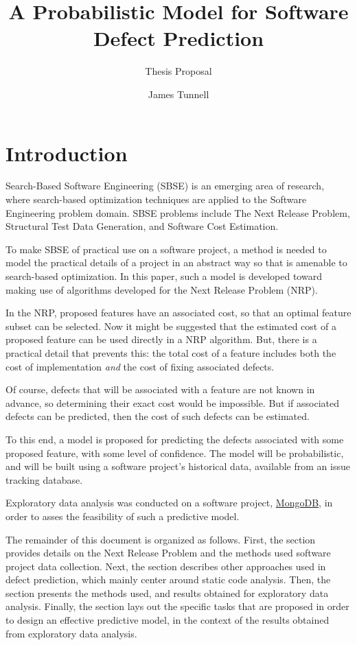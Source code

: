 \documentclass[a4paper]{scrartcl}
\begin{document}
\title{A Probabilistic Model for Software Defect Prediction}
\subtitle{Thesis Proposal}
\author{James Tunnell}
\maketitle

\section{Introduction}
Search-Based Software Engineering (SBSE) is an emerging area of research, where search-based optimization techniques are applied to the Software Engineering problem domain. SBSE problems include The Next Release Problem, Structural Test Data Generation, and Software Cost Estimation\cite{2012_harman_search}.

To make SBSE of practical use on a software project, a method is needed to model the practical details of a project in an abstract way so that is amenable to search-based optimization. In this paper, such a model is developed toward making use of algorithms developed for the Next Release Problem (NRP).

In the NRP, proposed features have an associated cost, so that an optimal feature subset can be selected. Now it might be suggested that the estimated cost of a proposed feature can be used directly in a NRP algorithm. But, there is a practical detail that prevents this: the total cost of a feature includes both the cost of implementation \emph{and} the cost of fixing associated defects.

Of course, defects that will be associated with a feature are not known in advance, so determining their exact cost would be impossible. But if associated defects can be predicted, then the cost of such defects can be estimated.

To this end, a model is proposed for predicting the defects associated with some proposed feature, with some level of confidence. The model will be probabilistic, and will be built using a software project's historical data, available from an issue tracking database.

Exploratory data analysis was conducted on a software project, \href{https://www.mongodb.org}{MongoDB}, in order to asses the feasibility of such a predictive model.

The remainder of this document is organized as follows. First, the  section provides details on the Next Release Problem and the methods used software project data collection. Next, the  section describes other approaches used in defect prediction, which mainly center around static code analysis. Then, the  section presents the  methods used, and results obtained for exploratory data analysis. Finally, the  section lays out the specific tasks that are proposed in order to design an effective predictive model, in the context of the results obtained from exploratory data analysis.
\end{document}

